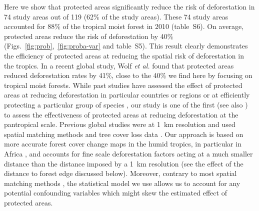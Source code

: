 \documentclass[
  12pt,
]{article}
\begin{document}
Here we show that protected areas significantly reduce the risk of deforestation in 74 study areas out of 119 (62\% of the study areas). These 74 study areas accounted for 88\% of the tropical moist forest in 2010 (table~S6). On average, protected areas reduce the risk of deforestation by 40\% (Figs.~\ref{fig:prob},~\ref{fig:proba-var} and table~S5). This result clearly demonstrates the efficiency of protected areas at reducing the spatial risk of deforestation in the tropics. In a recent global study, Wolf \emph{et al.} \citep{Wolf2021} found that protected areas reduced deforestation rates by 41\%, close to the 40\% we find here by focusing on tropical moist forests. While past studies have assessed the effect of protected areas at reducing deforestation in particular countries or regions \citep{Andam2008, Bruner2001} or at efficiently protecting a particular group of species \citep{Cazalis2020}, our study is one of the first (see also \citep{Wolf2021, Yang2021}) to assess the effectiveness of protected areas at reducing deforestation at the pantropical scale. Previous global studies \citep{Wolf2021, Yang2021} were at 1~km resolution and used spatial matching methods and tree cover loss data \citep{Hansen2013}. Our approach is based on more accurate forest cover change maps in the humid tropics, in particular in Africa \citep{Vancutsem2021}, and accounts for fine scale deforestation factors acting at a much smaller distance than the distance imposed by a 1~km resolution (see the effect of the distance to forest edge discussed below). Moreover, contrary to most spatial matching methods \citep{Andam2008, Schleicher2019}, the statistical model we use allows us to account for any potential confounding variables which might skew the estimated effect of protected areas.\\
\end{document}
